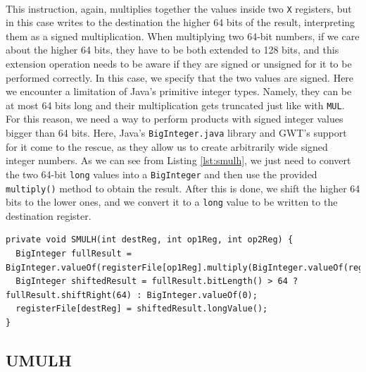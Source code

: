 \paragraph{}
This instruction, again, multiplies together the values inside two \verb|X| registers, but in this case writes to the destination the higher 64 bits of the result, interpreting them as a signed multiplication.  When multiplying two 64-bit numbers, if we care about the higher 64 bits, they have to be both extended to 128 bits, and this extension operation needs to be aware if they are signed or unsigned for it to be performed correctly. In this case, we specify that the two values are signed. Here we encounter a limitation of Java's primitive integer types. Namely, they can be at most 64 bits long and their multiplication gets truncated just like with \verb|MUL|. For this reason, we need a way to perform products with signed integer values bigger than 64 bits. Here, Java's \verb|BigInteger.java| library and GWT's support for it come to the rescue, as they allow us to create arbitrarily wide signed integer numbers. As we can see from Listing \ref{lst:smulh}, we just need to convert the two 64-bit \verb|long| values into a \verb|BigInteger| and then use the provided \verb|multiply()| method to obtain the result. After this is done, we shift the higher 64 bits to the lower ones, and we convert it to a \verb|long| value to be written to the destination register.
\begin{lstlisting}[float, caption={Implementation of the SMULH instruction}, label={lst:smulh}]
private void SMULH(int destReg, int op1Reg, int op2Reg) {
  BigInteger fullResult = BigInteger.valueOf(registerFile[op1Reg].multiply(BigInteger.valueOf(registerFile[op2Reg]));
  BigInteger shiftedResult = fullResult.bitLength() > 64 ? fullResult.shiftRight(64) : BigInteger.valueOf(0);
  registerFile[destReg] = shiftedResult.longValue();			
}
\end{lstlisting}
\subsection{UMULH}
